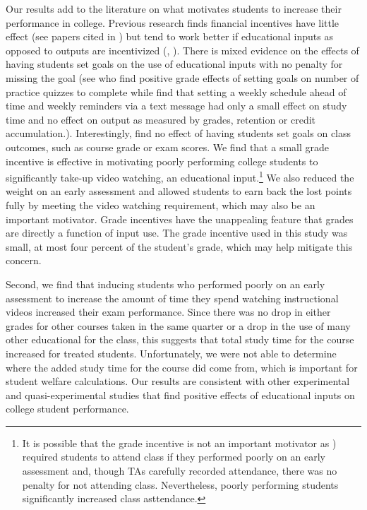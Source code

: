 \documentclass[12pt]{article}
\begin{document}
Our results add to the literature on what motivates students to increase their performance in college.  Previous research finds financial incentives have little effect (see papers cited in \textcite{gmr2011})  but tend to work better if educational inputs as opposed to outputs are  incentivized (\textcite{fryer2011}, \textcite{gmr2011}).  There is mixed evidence on the effects of having students set goals on the use of educational inputs with no penalty for missing the goal (see \textcite{cgpr2020} who find positive grade effects of setting goals on number of practice quizzes to complete while \textcite{oppp2019} find that setting a weekly schedule ahead of time and weekly reminders via a text message had only a small effect on study time and no effect on output as measured by grades, retention or credit accumulation.).  Interestingly, \textcite{cgpr2020} find no effect of having students set goals on class outcomes, such as course grade or exam scores.  We find that a small grade incentive is effective in motivating poorly performing college students to significantly take-up video watching, an educational input.\footnote{It is possible that the grade incentive is not an important motivator as \textcite{dgm2010}) required students to attend class if they performed poorly on an early assessment and, though TAs carefully recorded attendance, there was no penalty for not attending class.  Nevertheless, poorly performing students significantly increased class  asttendance.} We also reduced the weight on an early assessment and allowed students to earn back the lost points fully by meeting the video watching requirement, which may also be an important motivator. Grade incentives have the unappealing feature that grades are directly a function of input use. The grade incentive used in this study was small, at most four percent of the student's grade, which may help mitigate this concern.

Second, we find that inducing students who performed poorly on an early assessment to increase the amount of time they spend watching instructional videos increased their exam performance. Since there was no drop in either grades for other courses taken in the same quarter or a drop in the use of many other educational for the class, this suggests that total study time for the course increased for treated students. Unfortunately, we were not able to determine where the added study time for the course did come from, which is important for student welfare calculations. Our results are consistent with other experimental and quasi-experimental studies that find positive effects of educational inputs on college student performance. %
\end{document}
